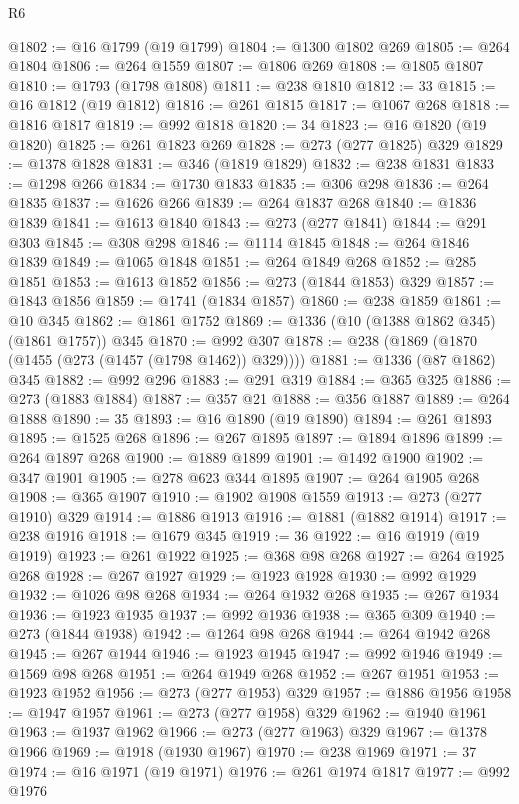 \begin{lexlean}{R6}
\begin{coremodule}
{{{{{{{{{{{{{{{{{{{@1802 := @16 @1799 (@19 @1799)
@1804 := @1300 @1802 @269
@1805 := @264 @1804
@1806 := @264 @1559
@1807 := @1806 @269
@1808 := @1805 @1807
@1810 := @1793 (@1798 @1808)
@1811 := @238 @1810
@1812 := 33
@1815 := @16 @1812 (@19 @1812)
@1816 := @261 @1815
@1817 := @1067 @268
@1818 := @1816 @1817
@1819 := @992 @1818
@1820 := 34
@1823 := @16 @1820 (@19 @1820)
@1825 := @261 @1823 @269
@1828 := @273 (@277 @1825) @329
@1829 := @1378 @1828
@1831 := @346 (@1819 @1829)
@1832 := @238 @1831
@1833 := @1298 @266
@1834 := @1730 @1833
@1835 := @306 @298
@1836 := @264 @1835
@1837 := @1626 @266
@1839 := @264 @1837 @268
@1840 := @1836 @1839
@1841 := @1613 @1840
@1843 := @273 (@277 @1841)
@1844 := @291 @303
@1845 := @308 @298
@1846 := @1114 @1845
@1848 := @264 @1846 @1839
@1849 := @1065 @1848
@1851 := @264 @1849 @268
@1852 := @285 @1851
@1853 := @1613 @1852
@1856 := @273 (@1844 @1853) @329
@1857 := @1843 @1856
@1859 := @1741 (@1834 @1857)
@1860 := @238 @1859
@1861 := @10 @345
@1862 := @1861 @1752
@1869 := @1336 (@10 (@1388 @1862 @345) (@1861 @1757)) @345
@1870 := @992 @307
@1878 := @238 (@1869 (@1870 (@1455 (@273 (@1457 (@1798 @1462)) @329))))
@1881 := @1336 (@87 @1862) @345
@1882 := @992 @296
@1883 := @291 @319
@1884 := @365 @325
@1886 := @273 (@1883 @1884)
@1887 := @357 @21
@1888 := @356 @1887
@1889 := @264 @1888
@1890 := 35
@1893 := @16 @1890 (@19 @1890)
@1894 := @261 @1893
@1895 := @1525 @268
@1896 := @267 @1895
@1897 := @1894 @1896
@1899 := @264 @1897 @268
@1900 := @1889 @1899
@1901 := @1492 @1900
@1902 := @347 @1901
@1905 := @278 @623 @344 @1895
@1907 := @264 @1905 @268
@1908 := @365 @1907
@1910 := @1902 @1908 @1559
@1913 := @273 (@277 @1910) @329
@1914 := @1886 @1913
@1916 := @1881 (@1882 @1914)
@1917 := @238 @1916
@1918 := @1679 @345
@1919 := 36
@1922 := @16 @1919 (@19 @1919)
@1923 := @261 @1922
@1925 := @368 @98 @268
@1927 := @264 @1925 @268
@1928 := @267 @1927
@1929 := @1923 @1928
@1930 := @992 @1929
@1932 := @1026 @98 @268
@1934 := @264 @1932 @268
@1935 := @267 @1934
@1936 := @1923 @1935
@1937 := @992 @1936
@1938 := @365 @309
@1940 := @273 (@1844 @1938)
@1942 := @1264 @98 @268
@1944 := @264 @1942 @268
@1945 := @267 @1944
@1946 := @1923 @1945
@1947 := @992 @1946
@1949 := @1569 @98 @268
@1951 := @264 @1949 @268
@1952 := @267 @1951
@1953 := @1923 @1952
@1956 := @273 (@277 @1953) @329
@1957 := @1886 @1956
@1958 := @1947 @1957
@1961 := @273 (@277 @1958) @329
@1962 := @1940 @1961
@1963 := @1937 @1962
@1966 := @273 (@277 @1963) @329
@1967 := @1378 @1966
@1969 := @1918 (@1930 @1967)
@1970 := @238 @1969
@1971 := 37
@1974 := @16 @1971 (@19 @1971)
@1976 := @261 @1974 @1817
@1977 := @992 @1976
}}}}}}}}}}}}}}}}}}}
\end{coremodule}
\end{lexlean}
